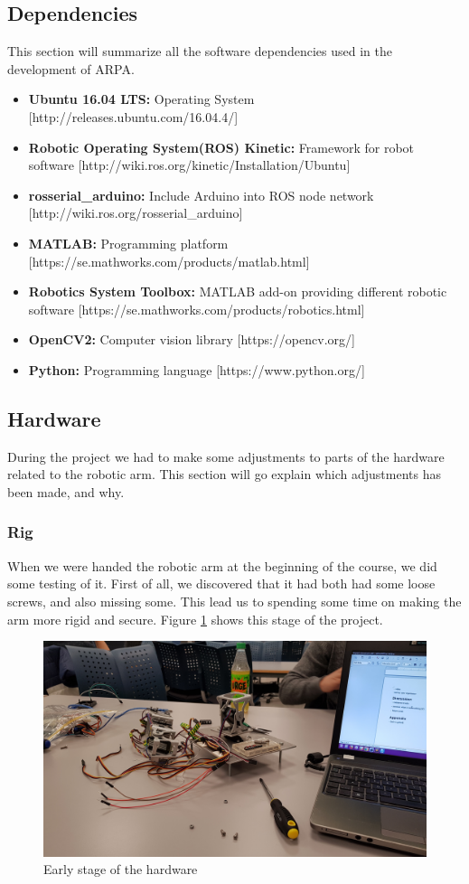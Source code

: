 \documentclass[11pt,a4paper]{report}
\begin{document}
	\subsection{Dependencies}
	This section will summarize all the software dependencies used in the development of ARPA.
	\begin{itemize}
		\item \textbf{Ubuntu 16.04 LTS:} Operating System [http://releases.ubuntu.com/16.04.4/]
		\item \textbf{Robotic Operating System(ROS) Kinetic:} Framework for robot software [http://wiki.ros.org/kinetic/Installation/Ubuntu]
		\item \textbf{rosserial\_arduino:} Include Arduino into ROS node network [http://wiki.ros.org/rosserial\_arduino]
		\item \textbf{MATLAB:} Programming platform [https://se.mathworks.com/products/matlab.html]
		\item \textbf{Robotics System Toolbox:} MATLAB add-on providing different robotic software [https://se.mathworks.com/products/robotics.html]
		\item \textbf{OpenCV2:} Computer vision library [https://opencv.org/]
		\item \textbf{Python:} Programming language [https://www.python.org/]
	\end{itemize}
	
	\subsection{Hardware}
	During the project we had to make some adjustments to parts of the hardware related to the robotic arm. This section will go explain which adjustments has been made, and why.
	\subsubsection{Rig}
	When we were handed the robotic arm at the beginning of the course, we did some testing of it. First of all, we discovered that it had both had some loose screws, and also missing some. This lead us to spending some time on making the arm more rigid and secure. Figure \ref{fig:early-rig} shows this stage of the project.
	
	\begin{figure}[H]
		\centering
		\includegraphics[width=0.8\linewidth]{../Diagrams/early-setup.jpg}
		\caption{Early stage of the hardware}
		\label{fig:early-rig}
	\end{figure}
	
\end{document}
